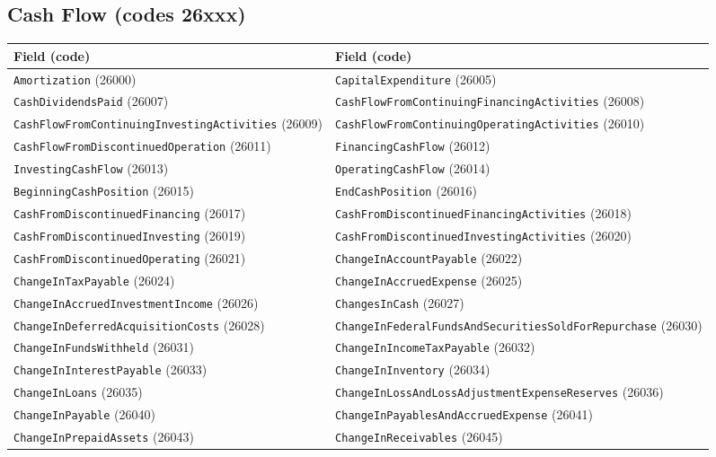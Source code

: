 \documentclass[11pt,a4paper]{report}
\begin{document}
\begin{subappendices}
\section{Cash Flow (codes 26xxx)}
{\footnotesize
\begin{longtable}{@{}p{}p{}@{}}
\toprule \textbf{Field (code)} & \textbf{Field (code)} \\
\midrule \endhead
\texttt{Amortization} (26000) & \texttt{CapitalExpenditure} (26005) \\
\texttt{CashDividendsPaid} (26007) & \texttt{CashFlowFromContinuingFinancingActivities} (26008) \\
\texttt{CashFlowFromContinuingInvestingActivities} (26009) & \texttt{CashFlowFromContinuingOperatingActivities} (26010) \\
\texttt{CashFlowFromDiscontinuedOperation} (26011) & \texttt{FinancingCashFlow} (26012) \\
\texttt{InvestingCashFlow} (26013) & \texttt{OperatingCashFlow} (26014) \\
\texttt{BeginningCashPosition} (26015) & \texttt{EndCashPosition} (26016) \\
\texttt{CashFromDiscontinuedFinancing} (26017) & \texttt{CashFromDiscontinuedFinancingActivities} (26018) \\
\texttt{CashFromDiscontinuedInvesting} (26019) & \texttt{CashFromDiscontinuedInvestingActivities} (26020) \\
\texttt{CashFromDiscontinuedOperating} (26021) & \texttt{ChangeInAccountPayable} (26022) \\
\texttt{ChangeInTaxPayable} (26024) & \texttt{ChangeInAccruedExpense} (26025) \\
\texttt{ChangeInAccruedInvestmentIncome} (26026) & \texttt{ChangesInCash} (26027) \\
\texttt{ChangeInDeferredAcquisitionCosts} (26028) & \texttt{ChangeInFederalFundsAndSecuritiesSoldForRepurchase} (26030) \\
\texttt{ChangeInFundsWithheld} (26031) & \texttt{ChangeInIncomeTaxPayable} (26032) \\
\texttt{ChangeInInterestPayable} (26033) & \texttt{ChangeInInventory} (26034) \\
\texttt{ChangeInLoans} (26035) & \texttt{ChangeInLossAndLossAdjustmentExpenseReserves} (26036) \\
\texttt{ChangeInPayable} (26040) & \texttt{ChangeInPayablesAndAccruedExpense} (26041) \\
\texttt{ChangeInPrepaidAssets} (26043) & \texttt{ChangeInReceivables} (26045) \\

\end{longtable}}
\end{subappendices}
\end{document}
